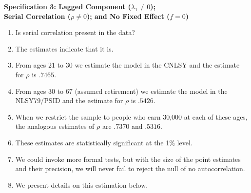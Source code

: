 \documentclass[static]{JJH-Beamer}
\begin{document}
\begin{frame}

\textbf{Specification 3: Lagged Component ($\lambda_{1} \neq 0$); \\Serial Correlation ($\rho \neq 0$); and No Fixed Effect ($f = 0$)}

\begin{enumerate}
\item Is serial correlation present in the data?
\item The estimates indicate that it is.
\item From ages 21 to 30 we estimate the model in the CNLSY and the estimate for $\rho$ is $.7465$.
\item From ages 30 to 67 (assumed retirement) we estimate the model in the NLSY79/PSID and the estimate for $\rho$ is $.5426$.
\item When we restrict the sample to people who earn 30,000 at each of these ages, the analogous estimates of $\rho$ are $.7370$ and $.5316$.
\item These estimates are statistically significant at the 1\% level.
\item We could invoke more formal tests, but with the size of the point estimates and their precision, we will never fail to reject the null of no autocorrelation.
\item We present details on this estimation below.
\end{enumerate}

\end{frame}
\end{document}
